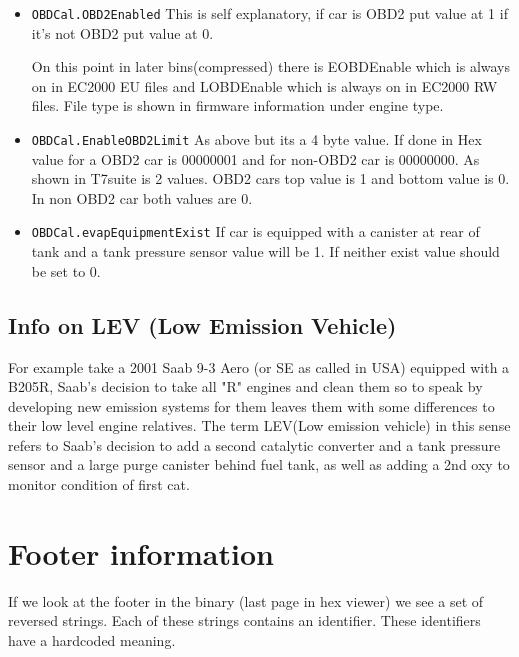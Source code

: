 \documentclass[11pt,a4paper]{book}
\begin{document}
    \begin{itemize}
        \item
            \texttt{OBDCal.OBD2Enabled} This is self explanatory, if car is OBD2
            put value at 1 if it's not OBD2 put value at 0.

On this point in later bins(compressed) there is EOBDEnable which is always on
in EC2000 EU files and LOBDEnable which is always on in EC2000 RW files. File
type is shown in firmware information under engine type.

\item \texttt{OBDCal.EnableOBD2Limit} As above but its a 4 byte value. If done
    in Hex value for a OBD2 car is 00000001 and for non-OBD2 car is 00000000. As
    shown in T7suite is 2 values. OBD2 cars top value is 1 and bottom value is
    0. In non OBD2 car both values are 0.

\item \texttt{OBDCal.evapEquipmentExist} If car is equipped with a canister at
rear of tank and a tank pressure sensor value will be 1. If neither exist value
should be set to 0.
\end{itemize}

\subsection{Info on LEV (Low Emission Vehicle)}
For example take a 2001 Saab 9-3 Aero (or SE as called in USA) equipped with a
B205R, Saab's decision to take all "R" engines and clean them so to speak by
developing new emission systems for them leaves them with some differences to
their low level engine relatives. The term LEV(Low emission vehicle) in this
sense refers to Saab's decision to add a second catalytic converter and a tank
pressure sensor and a large purge canister behind fuel tank, as well as adding a
2nd oxy to monitor condition of first cat.

\section{Footer information}
If we look at the footer in the binary (last page in hex viewer) we see a set of
reversed strings. Each of these strings contains an identifier. These
identifiers have a hardcoded meaning.
\end{document}
